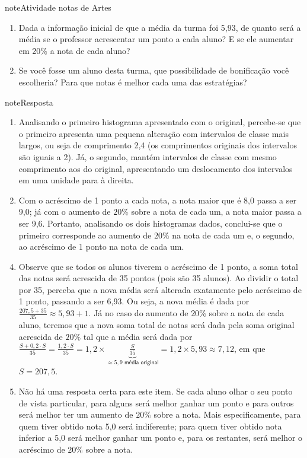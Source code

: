 \begin{sphinxadmonition}{note}{Atividade}{ notas de Artes}
\begin{enumerate}
\item {} 
Dada a informação inicial de que a média da turma foi 5,93, de quanto será a média se o professor acrescentar um ponto a cada aluno? E se ele aumentar em 20\% a nota de cada aluno?

\item {} 
Se você fosse um aluno desta turma, que possibilidade de bonificação você escolheria? Para que notas é melhor cada uma das estratégias?

\end{enumerate}
\end{sphinxadmonition}

\begin{sphinxadmonition}{note}{Resposta}
\begin{enumerate}
\item {} 
Analisando o primeiro histograma apresentado com o original, percebe-se que o primeiro apresenta uma pequena alteração com intervalos de classe mais largos, ou seja de comprimento 2,4 (os comprimentos originais dos intervalos são iguais a 2). Já, o segundo, mantém intervalos de classe com mesmo comprimento aos do original, apresentando um deslocamento dos intervalos em uma unidade para à direita.

\item {} 
Com o acréscimo de 1 ponto a cada nota, a nota maior que é 8,0 passa a ser 9,0; já com o aumento de $20\%$ sobre a nota de cada um, a nota maior passa a ser 9,6. Portanto, analisando os dois histogramas dados, conclui-se que o primeiro corresponde ao aumento de $20\%$ na nota de cada um e, o segundo, ao acréscimo de 1 ponto na nota de cada um.

\end{enumerate}
\begin{enumerate}
\setcounter{enumi}{3}
\item {} 
Observe que se todos os alunos tiverem o acréscimo de 1 ponto, a soma total das notas será acrescida de 35 pontos (pois são 35 alunos). Ao dividir o total por 35, perceba que a nova média será alterada exatamente pelo acréscimo de 1 ponto, passando a ser 6,93. Ou seja, a nova média é dada por \(\frac{207,5+35}{35}\approx 5,93+1\). Já no caso do aumento de $20\%$ sobre a nota de cada aluno, teremos que a nova soma total de notas será dada pela soma original acrescida de $20\%$ tal que a média será dada por \(\frac{S+0,2\cdot S}{35}=\frac{1,2\cdot S}{35}=1,2\times \underbrace{\frac{S}{35}}_{\approx 5,9 \textsf{ média original}} = 1,2\times 5,93\approx 7,12\), em que \(S=207,5\).

\item {} 
Não há uma resposta certa para este item. Se cada aluno olhar o seu ponto de vista particular, para alguns será melhor ganhar um ponto e para outros será melhor ter um aumento de $20\%$ sobre a nota. Mais especificamente, para quem tiver obtido nota 5,0 será indiferente; para quem tiver obtido nota inferior a 5,0 será melhor ganhar um ponto e, para os restantes, será melhor o acréscimo de $20\%$ sobre a nota.

\end{enumerate}
\end{sphinxadmonition}
